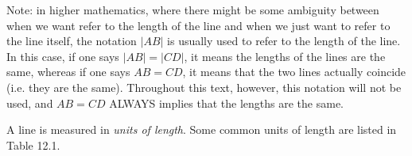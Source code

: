       \label{m39370*eip-313}Note: in higher mathematics, where there might be some ambiguity between when we want refer to the length of the line and when we just want to refer to the line itself, the notation \begin{math}|AB|\end{math}\hspace{1ex} is usually used to refer to the length of the line. In this case, if one says \begin{math}|AB|=|CD|\end{math}, it means the lengths of the lines are the same, whereas if one says \begin{math}AB=CD\end{math}, it means that the two lines actually coincide (i.e. they are the same). Throughout this text, however, this notation will not be used, and \begin{math}AB=CD\end{math} ALWAYS implies that the lengths are the same. \par \label{m39370*id314000}A line is measured in \textsl{units of length}. Some common units of length are listed in Table 12.1.\par 
    \setlength\mytablespace{4\tabcolsep}
    \addtolength\mytablespace{3\arrayrulewidth}
    \setlength\mytablewidth{\linewidth}
    \setlength\mytableroom{\mytablewidth}
    \addtolength\mytableroom{-\mytablespace}
    \setlength\myfixedwidth{0pt}
    \setlength\mystarwidth{\mytableroom}
        \addtolength\mystarwidth{-\myfixedwidth}
        \divide{}
